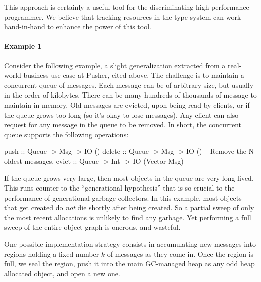 \documentclass[11pt]{article}
\begin{document}
This approach is certainly a useful tool for the discriminating
high-performance programmer. We believe that tracking resources in the
type system can work hand-in-hand to enhance the power of this tool.

\paragraph{Example 1} Consider the following example, a slight
generalization extracted from a real-world business use case at
Pusher, cited above. The challenge is to maintain a concurrent queue
of messages. Each message can be of arbitrary size, but usually in the
order of kilobytes. There can be many hundreds of thousands of message
to maintain in memory. Old messages are evicted, upon being read by
clients, or if the queue grows too long (so it's okay to lose
messages). Any client can also request for any message in the queue to
be removed. In short, the concurrent queue supports the following
operations:

\begin{code}
push :: Queue -> Msg -> IO ()
delete :: Queue -> Msg -> IO ()
-- Remove the N oldest messages.
evict :: Queue -> Int -> IO (Vector Msg)
\end{code}

If the queue grows very large, then most objects in the queue are very
long-lived. This runs counter to the ``generational hypothesis'' that
is so crucial to the performance of generational garbage collectors.
In this example, most objects that get created do {\em not} die
shortly after being created. So a partial sweep of only the most
recent allocations is unlikely to find any garbage. Yet performing
a full sweep of the entire object graph is onerous, and wasteful.

One possible implementation strategy consists in accumulating new
messages into regions holding a fixed number $k$ of messages as they
come in. Once the region is full, we seal the region, push it into the
main GC-managed heap as any odd heap allocated object, and open a new
one.
\end{document}
